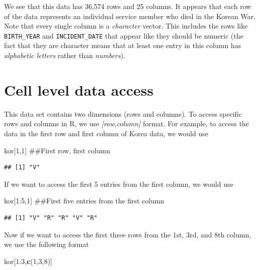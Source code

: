 \documentclass[]{book}
\newenvironment{Shaded}{\begin{snugshade}}{\end{snugshade}}
\newcommand{\KeywordTok}[1]{\textcolor[rgb]{0.13,0.29,0.53}{\textbf{{#1}}}}
\newcommand{\DecValTok}[1]{\textcolor[rgb]{0.00,0.00,0.81}{{#1}}}
\newcommand{\NormalTok}[1]{{#1}}
\begin{document}
We see that this data has 36,574 rows and 25 columns. It appears that
each row of the data represents an individual service member who died in
the Korean War. Note that every single column is a \emph{character}
vector. This includes the rows like \texttt{BIRTH\_YEAR} and
\texttt{INCIDENT\_DATE} that appear like they should be numeric (the
fact that they are character means that at least one entry in this
column has \emph{alphabetic letters} rather than \emph{numbers}).

\section{Cell level data access}\label{cell-level-data-access}

This data set contains two dimensions (rows and columns). To access
specific rows and columns in R, we use \emph{{[}row,column{]}} format.
For example, to access the data in the first row and first column of
Korea data, we would use

\begin{Shaded}
\begin{Highlighting}[]
\NormalTok{kor[}\DecValTok{1}\NormalTok{,}\DecValTok{1}\NormalTok{]  ##First row, first column}
\end{Highlighting}
\end{Shaded}

\begin{verbatim}
## [1] "V"
\end{verbatim}

If we want to access the first 5 entries from the first column, we would
use

\begin{Shaded}
\begin{Highlighting}[]
\NormalTok{kor[}\DecValTok{1}\NormalTok{:}\DecValTok{5}\NormalTok{,}\DecValTok{1}\NormalTok{] ##First five entries from the first column}
\end{Highlighting}
\end{Shaded}

\begin{verbatim}
## [1] "V" "R" "R" "V" "R"
\end{verbatim}

Now if we want to access the first three rows from the 1st, 3rd, and 8th
column, we use the following format

\begin{Shaded}
\begin{Highlighting}[]
\NormalTok{kor[}\DecValTok{1}\NormalTok{:}\DecValTok{3}\NormalTok{,}\KeywordTok{c}\NormalTok{(}\DecValTok{1}\NormalTok{,}\DecValTok{3}\NormalTok{,}\DecValTok{8}\NormalTok{)]}
\end{Highlighting}
\end{Shaded}
\end{document}

